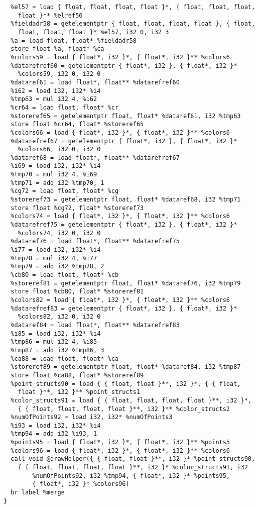 \documentclass[main.tex]{subfiles}
\begin{document}
{\begin{lstlisting}
  %el57 = load { float, float, float, float }*, { float, float, float,
    float }** %elref56
  %fieldadr58 = getelementptr { float, float, float, float }, { float,
    float, float, float }* %el57, i32 0, i32 3
  %a = load float, float* %fieldadr58
  store float %a, float* %ca
  %colors59 = load { float*, i32 }*, { float*, i32 }** %colors6
  %datarefref60 = getelementptr { float*, i32 }, { float*, i32 }*
    %colors59, i32 0, i32 0
  %dataref61 = load float*, float** %datarefref60
  %i62 = load i32, i32* %i4
  %tmp63 = mul i32 4, %i62
  %cr64 = load float, float* %cr
  %storeref65 = getelementptr float, float* %dataref61, i32 %tmp63
  store float %cr64, float* %storeref65
  %colors66 = load { float*, i32 }*, { float*, i32 }** %colors6
  %datarefref67 = getelementptr { float*, i32 }, { float*, i32 }*
    %colors66, i32 0, i32 0
  %dataref68 = load float*, float** %datarefref67
  %i69 = load i32, i32* %i4
  %tmp70 = mul i32 4, %i69
  %tmp71 = add i32 %tmp70, 1
  %cg72 = load float, float* %cg
  %storeref73 = getelementptr float, float* %dataref68, i32 %tmp71
  store float %cg72, float* %storeref73
  %colors74 = load { float*, i32 }*, { float*, i32 }** %colors6
  %datarefref75 = getelementptr { float*, i32 }, { float*, i32 }*
    %colors74, i32 0, i32 0
  %dataref76 = load float*, float** %datarefref75
  %i77 = load i32, i32* %i4
  %tmp78 = mul i32 4, %i77
  %tmp79 = add i32 %tmp78, 2
  %cb80 = load float, float* %cb
  %storeref81 = getelementptr float, float* %dataref76, i32 %tmp79
  store float %cb80, float* %storeref81
  %colors82 = load { float*, i32 }*, { float*, i32 }** %colors6
  %datarefref83 = getelementptr { float*, i32 }, { float*, i32 }*
    %colors82, i32 0, i32 0
  %dataref84 = load float*, float** %datarefref83
  %i85 = load i32, i32* %i4
  %tmp86 = mul i32 4, %i85
  %tmp87 = add i32 %tmp86, 3
  %ca88 = load float, float* %ca
  %storeref89 = getelementptr float, float* %dataref84, i32 %tmp87
  store float %ca88, float* %storeref89
  %point_structs90 = load { { float, float }**, i32 }*, { { float, 
    float }**, i32 }** %point_structs1
  %color_structs91 = load { { float, float, float, float }**, i32 }*,
    { { float, float, float, float }**, i32 }** %color_structs2
  %numOfPoints92 = load i32, i32* %numOfPoints3
  %i93 = load i32, i32* %i4
  %tmp94 = add i32 %i93, 1
  %points95 = load { float*, i32 }*, { float*, i32 }** %points5
  %colors96 = load { float*, i32 }*, { float*, i32 }** %colors6
  call void @drawHelper({ { float, float }**, i32 }* %point_structs90, 
    { { float, float, float, float }**, i32 }* %color_structs91, i32 
        %numOfPoints92, i32 %tmp94, { float*, i32 }* %points95, 
        { float*, i32 }* %colors96)
  br label %merge
}


\end{lstlisting}}
\end{document}
